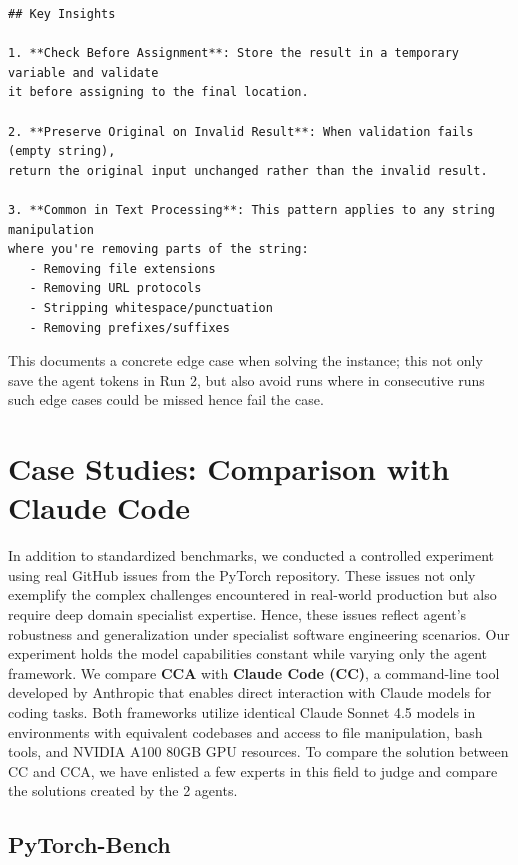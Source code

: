 \begin{tcolorbox}
\begin{verbatim}
## Key Insights

1. **Check Before Assignment**: Store the result in a temporary variable and validate
it before assigning to the final location.

2. **Preserve Original on Invalid Result**: When validation fails (empty string),
return the original input unchanged rather than the invalid result.

3. **Common in Text Processing**: This pattern applies to any string manipulation
where you're removing parts of the string:
   - Removing file extensions
   - Removing URL protocols
   - Stripping whitespace/punctuation
   - Removing prefixes/suffixes
\end{verbatim}
\end{tcolorbox}

This documents a concrete edge case when solving the instance; this not only save the agent tokens in Run 2, but also avoid runs where in consecutive runs such edge cases could be missed hence fail the case.  

\section{Case Studies: Comparison with Claude Code}
\label{sec:case_studies}

In addition to standardized benchmarks, we conducted a controlled experiment using real GitHub issues from the PyTorch repository. These issues not only exemplify the complex challenges encountered in real-world production but also require deep domain specialist expertise. Hence, these issues reflect agent's robustness and generalization under specialist software engineering scenarios. Our experiment holds the model capabilities constant while varying only the agent framework. We compare \textbf{CCA} with \textbf{Claude Code (CC)}, a command-line tool developed by Anthropic that enables direct interaction with Claude models for coding tasks. Both frameworks utilize identical Claude Sonnet 4.5 models in environments with equivalent codebases and access to file manipulation, bash tools, and NVIDIA A100 80GB GPU resources. To compare the solution between CC and CCA, we have enlisted a few experts in this field to judge and compare the solutions created by the 2 agents.


\subsection{PyTorch-Bench}

